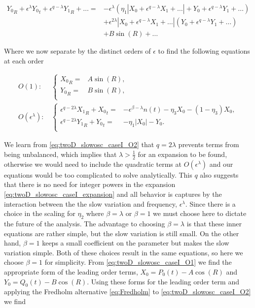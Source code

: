 \begin{equation*}
\begin{aligned}
{Y_0}_R+\epsilon^{\lambda}{Y_0}_t+\epsilon^{q-\lambda} {Y_1}_R+\ldots= &-\epsilon^\lambda(\eta_1| X_0 +\epsilon^{q-\lambda} X_1+\ldots|+ Y_0+\epsilon^{q-\lambda} Y_1+\ldots)\\
&+\epsilon^{2\lambda}|X_0 +\epsilon^{q-\lambda} X_1+\ldots|(Y_0+\epsilon^{q-\lambda} Y_1+\ldots)\\
&+ B\sin (R)+\ldots
\end{aligned}
\end{equation*}

Where we now separate by the distinct orders of $\epsilon$ to find the following equations at each order

\begin{align} \label{eq:twoD_slowosc_caseI_O1}
O(1):\, &\begin{cases}
	{X_0}_R =&  A\sin(R), \\
	{Y_0}_R =&  B\sin(R),\\
\end{cases}\\ \label{eq:twoD_slowosc_caseI_O2}
O(\epsilon^\lambda): \, & \begin{cases}
	\epsilon^{q-2\lambda}{X_1}_R+{X_0}_t =&  -\epsilon^{\beta-\lambda} n(t) -\eta_3 X_0-(1-\eta_3)X_0, \\
	\epsilon^{q-2\lambda}{Y_1}_R+{Y_0}_t =&  -\eta_1|X_0|-Y_0.\\
\end{cases}
\end{align}

We learn from \eqref{eq:twoD_slowosc_caseI_O2} that $q= 2\lambda$ prevents terms from being unbalanced, which implies that $\lambda> \frac{1}{2}$ for an expansion to be found, otherwise we would need to include the quadratic terms at $O(\epsilon^\lambda)$ and our equations would be too complicated to solve analytically. This $q$ also suggests that there is no need for integer powers in the expansion \eqref{eq:twoD_slowosc_caseI_expansion} and all behavior is captures by the interaction between the the slow variation and frequency, $\epsilon^\lambda$. Since there is a choice in the scaling for $\eta_2$ where $\beta=\lambda$ or $\beta=1$ we must choose here to dictate the future of the analysis. The advantage to choosing $\beta=\lambda$ is that these inner equations are rather simple, but the slow variation is still small. On the other hand, $\beta=1$ keeps a small coefficient on the parameter but makes the slow variation simple. Both of these choices result in the same equations, so here we choose $\beta=1$ for simplicity. From \eqref{eq:twoD_slowosc_caseI_O1} we find the appropriate form of the leading order terms, $X_0=P_0(t)-A\cos(R)$ and $Y_0=Q_0(t)-B\cos(R)$. Using these forms for the leading order term and applying the Fredholm alternative \eqref{eq:Fredholm} to \eqref{eq:twoD_slowosc_caseI_O2} we find 

